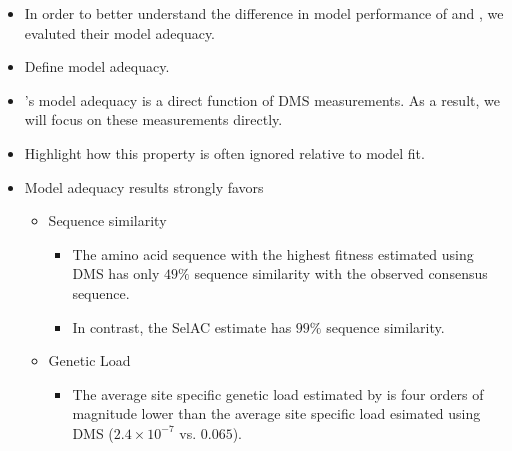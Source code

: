 \documentclass[12pt]{article}
\begin{document}
\begin{itemize}
\item In order to better understand the difference in model performance of \phydms and \selac, we evaluted their model adequacy.
\item Define model adequacy.
\item \phydms's model adequacy is a direct function of DMS measurements.  As a result, we will focus on these measurements directly.
\item Highlight how this property is often ignored relative to model fit.
\item Model adequacy results strongly favors \selac
  \begin{itemize}
  \item Sequence similarity
    \begin{itemize}
    \item The amino acid sequence with the highest fitness estimated using DMS has only $49 \%$ sequence similarity with the observed consensus sequence.
    \item In contrast, the SelAC estimate has $99 \%$ sequence similarity.
    \end{itemize}
  \item Genetic Load
    \begin{itemize}
    \item The average site specific genetic load estimated by \selac is four orders of magnitude lower than the average site specific load esimated using DMS ($2.4\times10^{-7}$ vs. $0.065$).
    \end{itemize}
  \end{itemize}
  

\end{itemize}
\end{document}
